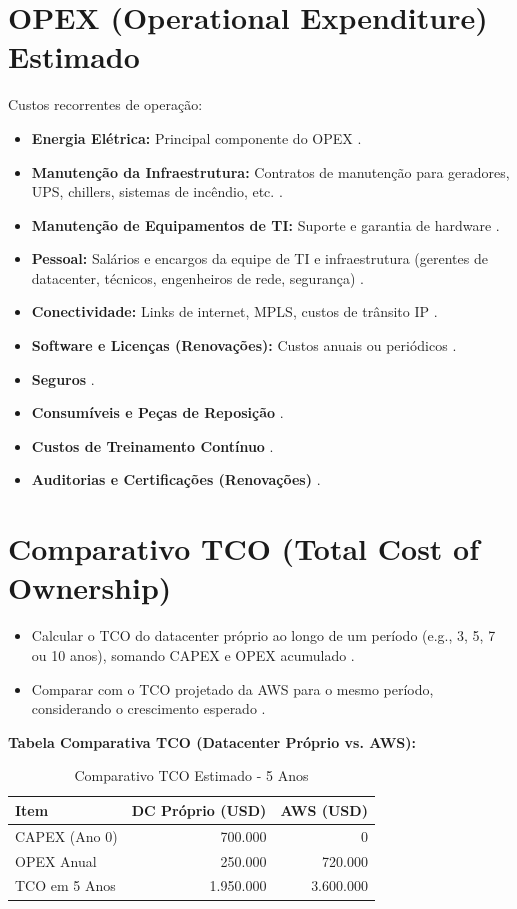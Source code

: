 \documentclass[
	12pt,				%
	oneside,			%
	a4paper,			%
	english,			%
	brazil				%
	]{abntex2unama}
\begin{document}
\section{OPEX (Operational Expenditure) Estimado}
Custos recorrentes de operação:
\begin{itemize}
	\item \textbf{Energia Elétrica:} Principal componente do OPEX \cite{energy_efficiency}.
	\item \textbf{Manutenção da Infraestrutura:} Contratos de manutenção para geradores, UPS, chillers, sistemas de incêndio, etc. \cite{datacenter_monitoring}.
	\item \textbf{Manutenção de Equipamentos de TI:} Suporte e garantia de hardware \cite{dcim_systems}.
	\item \textbf{Pessoal:} Salários e encargos da equipe de TI e infraestrutura (gerentes de datacenter, técnicos, engenheiros de rede, segurança) \cite{datacenter_automation}.
	\item \textbf{Conectividade:} Links de internet, MPLS, custos de trânsito IP \cite{network_fabric}.
	\item \textbf{Software e Licenças (Renovações):} Custos anuais ou periódicos \cite{software_defined}.
	\item \textbf{Seguros} \cite{disaster_recovery}.
	\item \textbf{Consumíveis e Peças de Reposição} \cite{dcim_evolution}.
	\item \textbf{Custos de Treinamento Contínuo} \cite{ai_automation}.
	\item \textbf{Auditorias e Certificações (Renovações)} \cite{green_datacenters}.
\end{itemize}

\section{Comparativo TCO (Total Cost of Ownership)}
\begin{itemize}
	\item Calcular o TCO do datacenter próprio ao longo de um período (e.g., 3, 5, 7 ou 10 anos), somando CAPEX e OPEX acumulado \cite{capacity_planning}.
	\item Comparar com o TCO projetado da AWS para o mesmo período, considerando o crescimento esperado \cite{cloud_infrastructure}.
\end{itemize}
\textbf{Tabela Comparativa TCO (Datacenter Próprio vs. AWS):}
\begin{table}[h]
	\centering
	\caption{Comparativo TCO Estimado - 5 Anos}
	\begin{tabular}{|p{4cm}|r|r|}
		\hline
		\textbf{Item} & \textbf{DC Próprio (USD)} & \textbf{AWS (USD)} \\
		\hline
		CAPEX (Ano 0) & 700.000                   & 0                  \\
		OPEX Anual    & 250.000                   & 720.000            \\
		\hline
		TCO em 5 Anos & 1.950.000                 & 3.600.000          \\
		\hline
	\end{tabular}
	\label{tab:tco}
\end{table}
\end{document}
